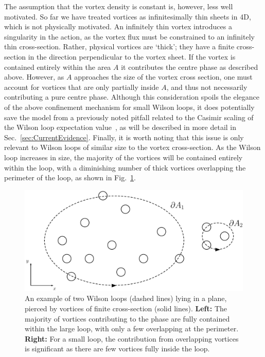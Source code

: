 The assumption that the vortex density is constant is, however, less well motivated. So far we have treated vortices as infinitesimally thin sheets in 4D, which is not physically motivated. An infinitely thin vortex introduces a singularity in the action, as the vortex flux must be constrained to an infinitely thin cross-section. Rather, physical vortices are `thick'; they have a finite cross-section in the direction perpendicular to the vortex sheet. If the vortex is contained entirely within the area $A$ it contributes the centre phase as described above. However, as $A$ approaches the size of the vortex cross section, one must account for vortices that are only partially inside $A$, and thus not necessarily contributing a pure centre phase. Although this consideration spoils the elegance of the above confinement mechanism for small Wilson loops, it does potentially save the model from a previously noted pitfall related to the Casimir scaling of the Wilson loop expectation value~\cite{Greensite:1982be,Faber:1997rp}, as will be described in more detail in Sec.~\ref{sec:CurrentEvidence}. Finally, it is worth noting that this issue is only relevant to Wilson loops of similar size to the vortex cross-section. As the Wilson loop increases in size, the majority of the vortices will be contained entirely within the loop, with a diminishing number of thick vortices overlapping the perimeter of the loop, as shown in Fig.~\ref{fig:VortexSizes}.\\
%
\begin{figure}[htb!]
\centering
\includegraphics[width=\linewidth]{./LargeVortex.pdf}
\caption{\label{fig:VortexSizes}An example of two Wilson loops (dashed lines) lying in a plane, pierced by vortices of finite cross-section (solid lines). \textbf{Left:} The majority of vortices contributing to the phase are fully contained within the large loop, with only a few overlapping at the perimeter. \textbf{Right:} For a small loop, the contribution from overlapping vortices is significant as there are few vortices fully inside the loop.}
\end{figure}

